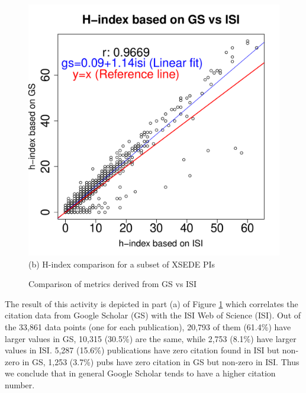 \documentclass{tex/sig-alternate}
\begin{document}
\begin{figure}[!htb]
\begin{minipage}[t]{0.22\textwidth}
    \includegraphics[width=1.0\columnwidth]{images/11_gs_vs_isi_hindex_bigfont.pdf} 
    (b) H-index comparison for a subset of XSEDE PIs
\end{minipage}

\caption{Comparison of metrics derived from GS vs ISI}\label{F:gs-vs-isi}
\end{figure}

% 
 
The result of this activity is depicted in part (a) of Figure \ref{F:gs-vs-isi} which correlates the citation data from Google Scholar (GS) with the ISI Web of Science (ISI). Out of the 33,861 data points (one for each publication), 20,793 of them (61.4\%) have larger values in GS, 10,315 (30.5\%) are the same, while 2,753 (8.1\%) have larger values in ISI. 5,287 (15.6\%) publications have zero citation found in ISI but non-zero in GS, 1,253 (3.7\%) pubs have zero citation in GS but non-zero in ISI. Thus we conclude that in general Google Scholar tends to have a higher citation number. 
 
\end{document}
